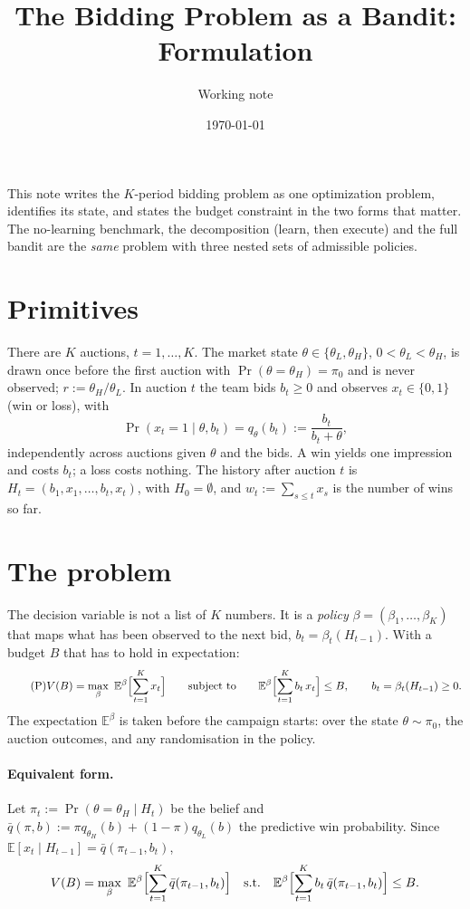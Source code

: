 \documentclass[11pt]{article}
\title{The Bidding Problem as a Bandit: Formulation}
\author{Working note}
\date{\today}
\newcommand{\E}{\mathbb{E}}
\newcommand{\qbar}{\bar q}
\theoremstyle{remark}
\begin{document}
\maketitle

\noindent This note writes the $K$-period bidding problem as one optimization problem, identifies its state, and
states the budget constraint in the two forms that matter. The no-learning benchmark, the decomposition
(learn, then execute) and the full bandit are the \emph{same} problem with three nested sets of admissible policies.

\section{Primitives}

There are $K$ auctions, $t=1,\dots,K$. The market state $\theta\in\{\theta_L,\theta_H\}$, $0<\theta_L<\theta_H$, is drawn
once before the first auction with $\Pr(\theta=\theta_H)=\pi_0$ and is never observed; $r:=\theta_H/\theta_L$. In auction
$t$ the team bids $b_t\ge0$ and observes $x_t\in\{0,1\}$ (win or loss), with
\[
\Pr(x_t=1\mid\theta,b_t)=q_\theta(b_t):=\frac{b_t}{b_t+\theta},
\]
independently across auctions given $\theta$ and the bids. A win yields one impression and costs $b_t$; a loss costs
nothing. The history after auction $t$ is $H_t=(b_1,x_1,\dots,b_t,x_t)$, with $H_0=\emptyset$, and
$w_t:=\sum_{s\le t}x_s$ is the number of wins so far.

\section{The problem}

The decision variable is not a list of $K$ numbers. It is a \emph{policy} $\beta=(\beta_1,\dots,\beta_K)$ that maps what
has been observed to the next bid, $b_t=\beta_t(H_{t-1})$. With a budget $B$ that has to hold in expectation:
\begin{equation}\tag{P}\label{eq:P}
V(B)=\max_{\beta}\ \E^{\beta}\Bigl[\sum_{t=1}^{K}x_t\Bigr]
\qquad\text{subject to}\qquad
\E^{\beta}\Bigl[\sum_{t=1}^{K}b_t\,x_t\Bigr]\le B,\qquad b_t=\beta_t(H_{t-1})\ge0 .
\end{equation}
The expectation $\E^\beta$ is taken before the campaign starts: over the state $\theta\sim\pi_0$, the auction
outcomes, and any randomisation in the policy.

\paragraph{Equivalent form.} Let $\pi_t:=\Pr(\theta=\theta_H\mid H_t)$ be the belief and
$\qbar(\pi,b):=\pi q_{\theta_H}(b)+(1-\pi)q_{\theta_L}(b)$ the predictive win probability. Since
$\E[x_t\mid H_{t-1}]=\qbar(\pi_{t-1},b_t)$,
\[
V(B)=\max_\beta\ \E^\beta\Bigl[\sum_{t=1}^K\qbar(\pi_{t-1},b_t)\Bigr]
\quad\text{s.t.}\quad \E^\beta\Bigl[\sum_{t=1}^Kb_t\,\qbar(\pi_{t-1},b_t)\Bigr]\le B .
\]
\end{document}
